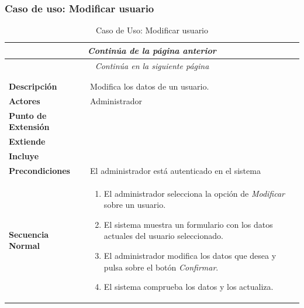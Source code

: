\subsubsection*{Caso de uso: Modificar usuario }
\begin{longtable}{| p{4cm} | p{10cm} |}
\endfirsthead
\multicolumn{2}{c}{\textit{Continúa de la página anterior}}\\[12pt]
\hline
\endhead
\hline
\multicolumn{2}{c}{\textit{Continúa en la siguiente página}} \\
\endfoot
\hline
\caption{Caso de Uso: Modificar usuario}\label{fig:1}\\
\endlastfoot


\hline
\multicolumn{2}{|c|}{\textbf{CU$<$25$>$ - Modificar Usuario}} \\

\hline
\textbf{Descripción} &
Modifica los datos de un usuario.\\

\hline
\textbf{Actores} &
Administrador\\

\hline
\textbf{Punto de Extensión} &
\\

\hline
\textbf{Extiende} &
\\

\hline
\textbf{Incluye} &
\\

\hline
\textbf{Precondiciones} &
El administrador está autenticado en el sistema\\

\hline
\textbf{Secuencia Normal} &\mbox{}\par\vspace{-\baselineskip}
\begin{enumerate}[leftmargin=0.7cm, topsep=0.1cm]
\item El administrador selecciona la opción de \textit{Modificar} sobre un usuario.
\item El sistema muestra un formulario con los datos actuales del usuario seleccionado.
\item El administrador modifica los datos que desea y pulsa sobre el botón \textit{Confirmar}.
\item El sistema comprueba los datos y los actualiza.
\end{enumerate}



\end{longtable}
